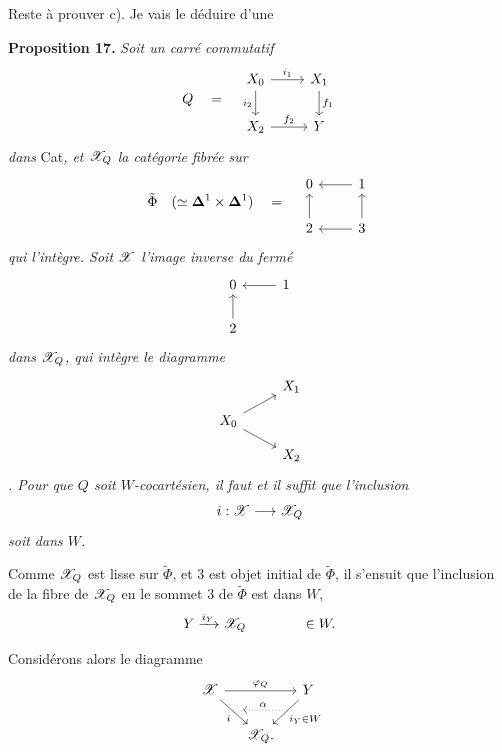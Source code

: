 \dgrchunkbegin


Reste à prouver c). Je vais le déduire d'une

\textbf{Proposition 17.} \textit{Soit un carré commutatif}
\[
Q \quad = \quad
\begin{tikzcd}[ampersand replacement=\&]
X_0 \arrow[r, "i_1"] \arrow[d, "i_2"'] \& X_1 \arrow[d, "f_1"] \\
X_2 \arrow[r, "f_2"] \& Y
\end{tikzcd}
\]
\textit{dans} Cat\textit{, et $\mathscr{X}_Q$ la catégorie fibrée sur}
\[
\tilde{\Phi} \quad (\simeq \mathbf{\Delta}^1 \times \mathbf{\Delta}^1) \quad = \quad
\begin{tikzcd}[ampersand replacement=\&]
0 \& 1 \arrow[l] \\
2 \arrow[u] \& 3 \arrow[l] \arrow[u]
\end{tikzcd}
\]
\textit{qui l'intègre. Soit $\mathscr{X}$ l'image inverse du fermé}
\[
\begin{tikzcd}[ampersand replacement=\&]
0 \& 1 \arrow[l] \\
2 \arrow[u] \&
\end{tikzcd}
\]
\textit{dans $\mathscr{X}_Q$, qui intègre le diagramme}
\[
\begin{tikzcd}[ampersand replacement=\&, row sep=small]
 \& X_1 \\
X_0 \arrow[ru] \arrow[rd] \& \\
 \& X_2
\end{tikzcd}
\]
\textit{. Pour que $Q$ soit $W$-cocartésien, il faut et il suffit que l'inclusion}
\[
i : \mathscr{X} \longrightarrow \mathscr{X}_Q
\]
\textit{soit dans $W$.}

Comme $\mathscr{X}_Q$ est lisse sur $\tilde{\Phi}$, et 3 est objet initial de $\tilde{\Phi}$, il s'ensuit que l'inclusion de la fibre de $\mathscr{X}_Q$ en le sommet 3 de $\tilde{\Phi}$ est dans $W$,
\[
Y \xrightarrow{i_Y} \mathscr{X}_Q \qquad\qquad \in W.
\]

Considérons alors le diagramme
\[
\begin{tikzcd}[ampersand replacement=\&, column sep=small]
\cX \arrow[rr, "\varphi_Q"] \arrow[rd, "i"', ""{name=direct,pos=.55,above right}] \& \& Y \arrow[ld, "i_Y\in W", ""{name=via,pos=.30,below left}] \\
 \& \cX_Q. \& \arrow[from=via,to=direct,dotted,shorten <=1pt,shorten >=1pt,"\alpha"']
\end{tikzcd}
\]

